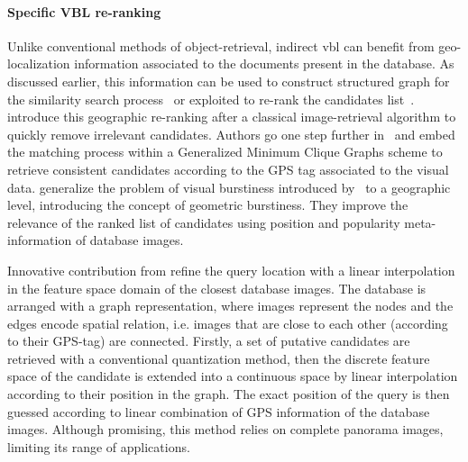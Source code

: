         \paragraph{Specific VBL re-ranking}            
            Unlike conventional methods of object-retrieval, indirect \ac{vbl} can benefit from geo-localization information associated to the documents present in the database. As discussed earlier, this information can be used to construct structured graph for the similarity search process~\citep{Torii2011,Cao2013} or exploited to re-rank the candidates list~\citep{Zamir2010,Zamir2014,Sattler2016}. \citet{Zamir2010} introduce this geographic re-ranking after a classical image-retrieval algorithm to quickly remove irrelevant candidates. Authors go one step further in~\citep{Zamir2014} and embed the matching process within a Generalized Minimum Clique Graphs scheme to retrieve consistent candidates according to the GPS tag associated to the visual data. \citet{Sattler2016} generalize the problem of visual burstiness introduced by~\citep{Jegou2009} to a geographic level, introducing the concept of geometric burstiness. They improve the relevance of the ranked list of candidates using position and popularity meta-information of database images.
            
            Innovative contribution from \citet{Torii2011} refine the query location with a linear interpolation in the feature space domain of the closest database images. The database is arranged with a graph representation, where images represent the nodes and the edges encode spatial relation, i.e. images that are close to each other (according to their GPS-tag) are connected. Firstly, a set of putative candidates are retrieved with a conventional quantization method, then the discrete feature space of the candidate is extended into a continuous space by linear interpolation according to their position in the graph. The exact position of the query is then guessed according to linear combination of GPS information of the database images. Although promising, this method relies on complete panorama images, limiting its range of applications.
       
